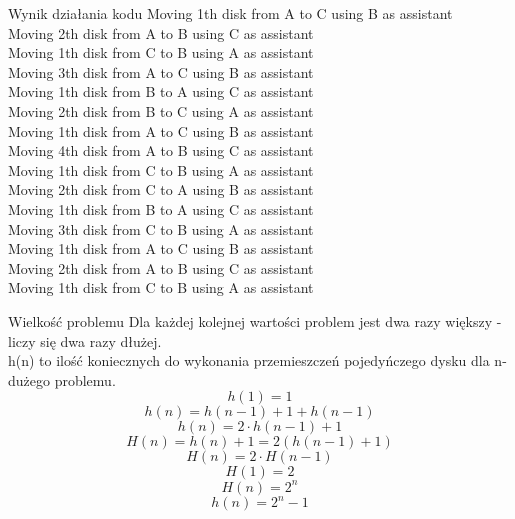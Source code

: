 \begin{frame}{Wynik działania kodu}
    \centering
    Moving 1th disk from A to C using B as assistant\\
    Moving 2th disk from A to B using C as assistant\\
    Moving 1th disk from C to B using A as assistant\\
    Moving 3th disk from A to C using B as assistant\\
    Moving 1th disk from B to A using C as assistant\\
    Moving 2th disk from B to C using A as assistant\\
    Moving 1th disk from A to C using B as assistant\\
    Moving 4th disk from A to B using C as assistant\\
    Moving 1th disk from C to B using A as assistant\\
    Moving 2th disk from C to A using B as assistant\\
    Moving 1th disk from B to A using C as assistant\\
    Moving 3th disk from C to B using A as assistant\\
    Moving 1th disk from A to C using B as assistant\\
    Moving 2th disk from A to B using C as assistant\\
    Moving 1th disk from C to B using A as assistant\\
\end{frame}
\begin{frame}{Wielkość problemu}
    Dla każdej kolejnej wartości problem jest dwa razy większy - liczy się dwa razy dłużej. \\
    h(n) to ilość koniecznych do wykonania przemieszczeń pojedyńczego dysku dla n-dużego problemu. \\
    \[ h(1) = 1 \]
    \[ h(n) = h(n-1) + 1 + h(n-1) \]
    \[ h(n) = 2 \cdot h(n-1) + 1 \]
    \[ H(n) = h(n) + 1 = 2(h(n-1) + 1) \]
    \[ H(n) = 2 \cdot H(n-1) \]
    \[ H(1) = 2 \]
    \[ H(n) = 2^n \]
    \[ h(n) = 2^n - 1 \]
\end{frame}
